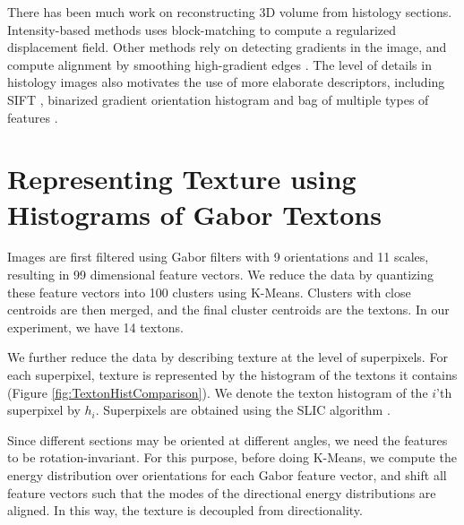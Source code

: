 \documentclass{llncs}
\begin{document}
There has been much work on reconstructing 3D volume from histology sections. Intensity-based methods \cite{ourselin2001reconstructing, roberts2012toward} uses block-matching to compute a regularized displacement field. Other methods rely on detecting gradients in the image, and compute alignment by smoothing high-gradient edges \cite{cifor2011smoothness, bagci2010automatic, haber2006intensity}. The level of details in histology images also motivates the use of more elaborate descriptors, including SIFT \cite{sun2012nearly}, binarized gradient orientation histogram \cite{kurkure2011landmark} and bag of multiple types of features \cite{cruz2011visual}. 


\section{Representing Texture using Histograms of Gabor Textons} 

%
%
%

Images are first filtered using Gabor filters\cite{jain1990unsupervised, clausi2000designing} with 9 orientations and 11 scales, resulting in 99 dimensional feature vectors. We reduce the data by quantizing these feature vectors into 100 clusters using K-Means. Clusters with close centroids are then merged, and the final cluster centroids are the textons. In our experiment, we have 14 textons.


We further reduce the data by describing texture at the level of superpixels. For each superpixel, texture is represented by the histogram of the textons it contains (Figure \ref{fig:TextonHistComparison}). We denote the texton histogram of the $i$'th superpixel by $h_i$. Superpixels are obtained using the SLIC algorithm \cite{achanta2012slic}.

Since different sections may be oriented at different angles, 
we need the features to be rotation-invariant. For this purpose, before doing K-Means, we compute the energy distribution over orientations for each Gabor feature vector, and shift all feature vectors such that the modes of the directional energy distributions are aligned. In this way, the texture is decoupled from directionality.
\end{document}
